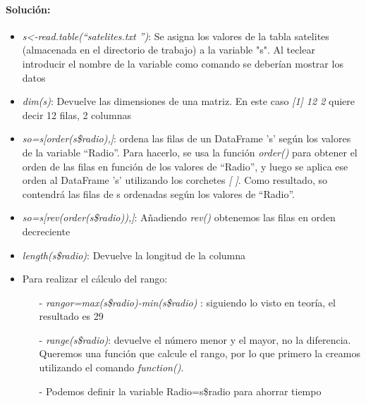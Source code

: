 \documentclass[a4paper, 12pt]{article}
\begin{document}
        \paragraph{Solución:}
        \begin{itemize}
            \item \emph{s<-read.table(\textquotedblleft satelites.txt \textquotedblright)}: Se asigna los valores de la tabla satelites (almacenada en el directorio de trabajo) a la variable "s". Al teclear introducir el nombre de la variable como comando se deberían mostrar los datos
            
            \item \emph{dim(s)}: Devuelve las dimensiones de una matriz. En este caso \emph{[1] 12 2} quiere decir 12 filas, 2 columnas
            
            \item \emph{so=s[order(s\$radio),]}: ordena las filas de un DataFrame 's' según los valores de la variable \textquotedblleft Radio\textquotedblright. Para hacerlo, se usa la función \emph{order()} para obtener el orden de las filas en función de los valores de \textquotedblleft Radio\textquotedblright, y luego se aplica ese orden al DataFrame 's' utilizando los corchetes \emph{[ ]}. Como resultado, so contendrá las filas de s ordenadas según los valores de \textquotedblleft Radio\textquotedblright.
        
            \item \emph{so=s[rev(order(s\$radio)),]}: Añadiendo \emph{rev()} obtenemos las filas en orden decreciente
        
            \item \emph{length(s\$radio)}: Devuelve la longitud de la columna
        
            \item Para realizar el cálculo del rango:
            \begin{itemize}
                \item[-] \emph{rangor=max(s\$radio)-min(s\$radio) }: siguiendo lo visto en teoría, el resultado es 29
                
                \item[-] \emph{range(s\$radio)}: devuelve el número menor y el mayor, no la diferencia. Queremos una función que calcule el rango, por lo que primero la creamos utilizando el comando \emph{function()}.
                
                \item[-] Podemos definir la variable Radio=s\$radio para ahorrar tiempo
                

\end{itemize}
\end{itemize}
\end{document}
